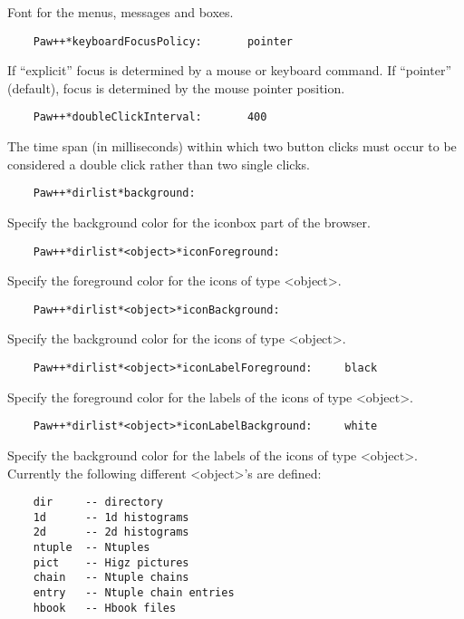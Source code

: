    Font for the menus, messages and boxes.

\begin{verbatim}
    Paw++*keyboardFocusPolicy:       pointer
\end{verbatim}

   If ``explicit'' focus is determined by a mouse or keyboard command.  If
   ``pointer'' (default), focus is determined by the mouse pointer position.

\begin{verbatim}
    Paw++*doubleClickInterval:       400
\end{verbatim}

   The time span (in milliseconds) within which two button clicks must occur
   to be considered a double click rather than two single clicks.

\begin{verbatim}
    Paw++*dirlist*background:
\end{verbatim}

   Specify the background color for the iconbox part of the browser.

\begin{verbatim}
    Paw++*dirlist*<object>*iconForeground:
\end{verbatim}

   Specify the foreground color for the icons of type <object>.

\begin{verbatim}
    Paw++*dirlist*<object>*iconBackground:
\end{verbatim}

   Specify the background color for the icons of type <object>.

\begin{verbatim}
    Paw++*dirlist*<object>*iconLabelForeground:     black
\end{verbatim}

   Specify the foreground color for the labels of the icons of type <object>.

\begin{verbatim}
    Paw++*dirlist*<object>*iconLabelBackground:     white
\end{verbatim}

   Specify the background color for the labels of the icons of type <object>.
   Currently the following different <object>'s are defined:

\begin{verbatim}
    dir     -- directory
    1d      -- 1d histograms
    2d      -- 2d histograms
    ntuple  -- Ntuples
    pict    -- Higz pictures
    chain   -- Ntuple chains
    entry   -- Ntuple chain entries
    hbook   -- Hbook files
\end{verbatim}

